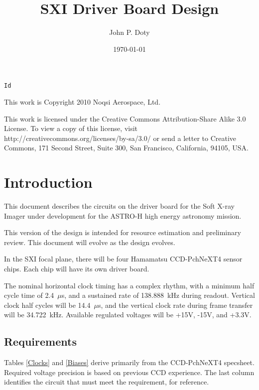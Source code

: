 \documentclass[a4paper,12pt]{article}
\author{John P. Doty}
\date{\today}
\title{SXI Driver Board Design}
\begin{document}
\begin{titlepage}
\maketitle
\begin{center}
\verb$Id$
\end{center}
\vspace{5cm}

This work is Copyright 2010 Noqsi Aerospace, Ltd.

This work is licensed under the Creative Commons Attribution-Share Alike 3.0 License. To view a copy of this license, visit http://creativecommons.org/licenses/by-sa/3.0/ or send a letter to Creative Commons, 171 Second Street, Suite 300, San Francisco, California, 94105, USA.

\end{titlepage} 

\section{Introduction}
This document describes the circuits on the driver board for the Soft X-ray Imager under development for the ASTRO-H high energy astronomy mission.

This version of the design is intended for resource estimation and preliminary review. This document will evolve as the design evolves.

In the SXI focal plane, there will be four Hamamatsu CCD-PchNeXT4 sensor chips. Each chip will have its own driver board. 

The nominal horizontal clock timing has a complex rhythm, with a minimum half cycle time of 2.4\ $\mu$s, and a sustained rate of 138.888\ kHz during readout. Vertical clock half cycles will be 14.4\ $\mu$s, and the vertical clock rate during frame transfer will be 34.722\ kHz. Available regulated voltages will be +15V, -15V, and +3.3V. 


\subsection{Requirements}
Tables \ref{Clocks} and \ref{Biases} derive primarily from the CCD-PchNeXT4 specsheet. Required voltage precision is based on previous CCD experience. The last column identifies the circuit that must meet the requirement, for reference.
\end{document}
